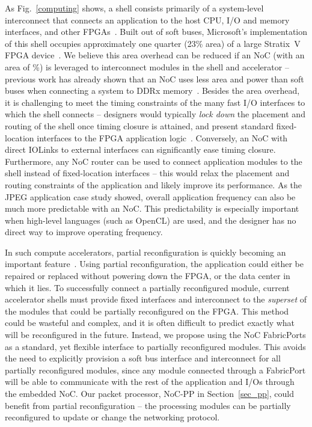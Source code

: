 As Fig.~\ref{computing} shows, a shell consists primarily of a system-level interconnect that connects an application to the host CPU, I/O and memory interfaces, and other FPGAs~\cite{Putnam2014,opencl}.
Built out of soft buses, Microsoft's implementation of this shell occupies approximately one quarter (23\% area) of a large Stratix~V FPGA device~\cite{Putnam2014}.
We believe this area overhead can be reduced if an NoC (with an area of \%) is leveraged to interconnect modules in the shell and accelerator -- previous work has already shown that an NoC uses less area and power than soft buses when connecting a system to DDRx memory~\cite{micro}.
Besides the area overhead, it is challenging to meet the timing constraints of the many fast I/O interfaces to which the shell connects -- designers would typically \textit{lock down} the placement and routing of the shell once timing closure is attained, and present standard fixed-location interfaces to the FPGA application logic~\cite{Putnam2014}.
Conversely, an NoC with direct IOLinks to external interfaces can significantly ease timing closure.
Furthermore, any NoC router can be used to connect application modules to the shell instead of fixed-location interfaces -- this would relax the placement and routing constraints of the application and likely improve its performance.
As the JPEG application case study showed, overall application frequency can also be much more predictable with an NoC.
This predictability is especially important when high-level languages (such as OpenCL) are used, and the designer has no direct way to improve operating frequency.

In such compute accelerators, partial reconfiguration is quickly becoming an important feature~\cite{Putnam2014}.
Using partial reconfiguration, the application could either be repaired or replaced without powering down the FPGA, or the data center in which it lies.
To successfully connect a partially reconfigured module, current accelerator shells must provide fixed interfaces and interconnect to the \textit{superset} of the modules that could be partially reconfigured on the FPGA.
This method could be wasteful and complex, and it is often difficult to predict exactly what will be reconfigured in the future.
Instead, we propose using the NoC FabricPorts as a standard, yet flexible interface to partially reconfigured modules.
This avoids the need to explicitly provision a soft bus interface and interconnect for all partially reconfigured modules, since any module connected through a FabricPort will be able to communicate with the rest of the application and I/Os through the embedded NoC.
Our packet processor, NoC-PP in Section~\ref{sec_pp}, could benefit from partial reconfiguration -- the processing modules can be partially reconfigured to update or change the networking protocol.



